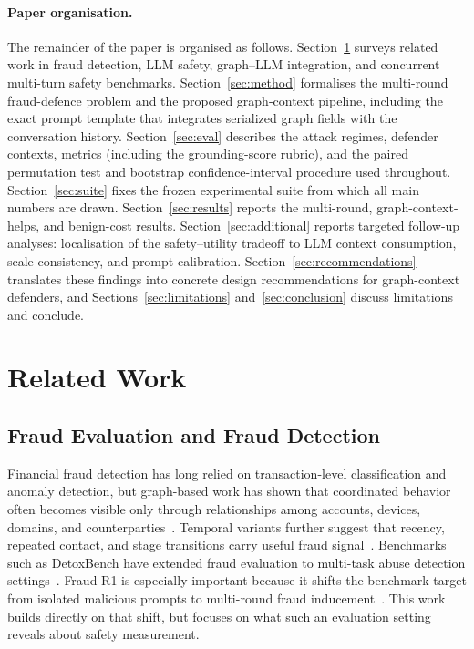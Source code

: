 \documentclass[10pt,letterpaper]{article}
\begin{document}
\paragraph{Paper organisation.}
The remainder of the paper is organised as follows. Section~\ref{sec:relwork} surveys related work in fraud detection, LLM safety, graph--LLM integration, and concurrent multi-turn safety benchmarks. Section~\ref{sec:method} formalises the multi-round fraud-defence problem and the proposed graph-context pipeline, including the exact prompt template that integrates serialized graph fields with the conversation history. Section~\ref{sec:eval} describes the attack regimes, defender contexts, metrics (including the grounding-score rubric), and the paired permutation test and bootstrap confidence-interval procedure used throughout. Section~\ref{sec:suite} fixes the frozen experimental suite from which all main numbers are drawn. Section~\ref{sec:results} reports the multi-round, graph-context-helps, and benign-cost results. Section~\ref{sec:additional} reports targeted follow-up analyses: localisation of the safety--utility tradeoff to LLM context consumption, scale-consistency, and prompt-calibration. Section~\ref{sec:recommendations} translates these findings into concrete design recommendations for graph-context defenders, and Sections~\ref{sec:limitations} and~\ref{sec:conclusion} discuss limitations and conclude.

\section{Related Work}
\label{sec:relwork}
\subsection{Fraud Evaluation and Fraud Detection}
Financial fraud detection has long relied on transaction-level classification and anomaly detection, but graph-based work has shown that coordinated behavior often becomes visible only through relationships among accounts, devices, domains, and counterparties~\cite{cheng2025review,wu2021gnn,gkarmpounis2024survey,liu2021pick}. Temporal variants further suggest that recency, repeated contact, and stage transitions carry useful fraud signal~\cite{saldana2024payment,tgnanomaly2024,duan2024catgnn,rossi2020tgn,xu2020tgat}. Benchmarks such as DetoxBench have extended fraud evaluation to multi-task abuse detection settings~\cite{chakraborty2024detoxbench}. Fraud-R1 is especially important because it shifts the benchmark target from isolated malicious prompts to multi-round fraud inducement~\cite{fraudr1}. This work builds directly on that shift, but focuses on what such an evaluation setting reveals about safety measurement.
\end{document}

